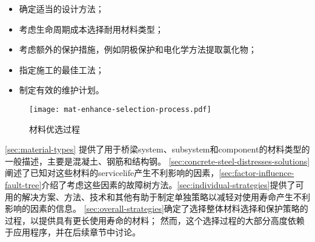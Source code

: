 \begin{itemize}
  \item 确定适当的设计方法；
  \item 考虑生命周期成本选择耐用材料类型；
  \item 考虑额外的保护措施，例如阴极保护和电化学方法提取氯化物；
  \item 指定施工的最佳工法；
  \item 制定有效的维护计划。
\end{itemize}

\begin{figure}
  \texttt{[image: mat-enhance-selection-process.pdf]}
  \caption{材料优选过程}\label{fig:mat-enhance-selection-process}
\end{figure}

\cref{sec:material-types} 提供了用于桥梁\gls*{system}、\gls*{subsystem}和\gls*{component}的材料类型的一般描述，主要是混凝土、钢筋和结构钢。 \cref{sec:concrete-steel-distresses-solutions}阐述了已知对这些材料的\gls*{servicelife}产生不利影响的因素，\cref{sec:factor-influence-fault-tree}介绍了考虑这些因素的{故障树}方法。\cref{sec:individual-strategies}提供了可用的解决方案、方法、技术和其他有助于制定单独策略以减轻对使用寿命产生不利影响的因素的信息。 \cref{sec:overall-strategies}确定了选择整体材料选择和保护策略的过程，以提供具有更长使用寿命的材料； 然而，这个选择过程的大部分高度依赖于应用程序，并在后续章节中讨论。

